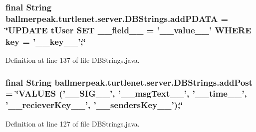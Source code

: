 \hypertarget{classballmerpeak_1_1turtlenet_1_1server_1_1DBStrings_aac23d2b9eecb5d6088f8bb5058370c7b}{
\subsubsection[{add\-P\-D\-A\-T\-A}]{\setlength{\rightskip}{0pt plus 5cm}final String ballmerpeak.\-turtlenet.\-server.\-D\-B\-Strings.\-add\-P\-D\-A\-T\-A = \char`\"{}U\-P\-D\-A\-T\-E t\-User S\-E\-T \-\_\-\-\_\-field\-\_\-\-\_\- = '\-\_\-\-\_\-value\-\_\-\-\_\-' W\-H\-E\-R\-E key = '\-\_\-\-\_\-key\-\_\-\-\_\-';\char`\"{}\hspace{0.3cm}{\ttfamily [static]}}}\label{classballmerpeak_1_1turtlenet_1_1server_1_1DBStrings_aac23d2b9eecb5d6088f8bb5058370c7b}


Definition at line 137 of file D\-B\-Strings.\-java.

\hypertarget{classballmerpeak_1_1turtlenet_1_1server_1_1DBStrings_a0fa383a5ec1519c387372722ee41a7fe}{
\subsubsection[{add\-Post}]{\setlength{\rightskip}{0pt plus 5cm}final String ballmerpeak.\-turtlenet.\-server.\-D\-B\-Strings.\-add\-Post = \char`\"{}V\-A\-L\-U\-E\-S ('\-\_\-\-\_\-\-S\-I\-G\-\_\-\-\_\-', '\-\_\-\-\_\-msg\-Text\-\_\-\-\_\-', '\-\_\-\-\_\-time\-\_\-\-\_\-', '\-\_\-\-\_\-reciever\-Key\-\_\-\-\_\-', '\-\_\-\-\_\-senders\-Key\-\_\-\-\_\-');\char`\"{}\hspace{0.3cm}{\ttfamily [static]}}}\label{classballmerpeak_1_1turtlenet_1_1server_1_1DBStrings_a0fa383a5ec1519c387372722ee41a7fe}


Definition at line 127 of file D\-B\-Strings.\-java.

